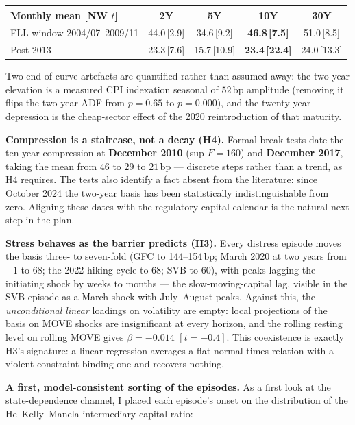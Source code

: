\documentclass[11pt]{article}
\newcommand{\bps}{\,\text{bp}}
\begin{document}
\begin{center}\small
\begin{tabular}{lcccc}
\toprule
Monthly mean [NW $t$] & 2Y & 5Y & 10Y & 30Y \\
\midrule
FLL window 2004/07--2009/11 & 44.0\,[2.9] & 34.6\,[9.2] & \textbf{46.8\,[7.5]} & 51.0\,[8.5] \\
Post-2013 & 23.3\,[7.6] & 15.7\,[10.9] & \textbf{23.4\,[22.4]} & 24.0\,[13.3] \\
\bottomrule
\end{tabular}
\end{center}

Two end-of-curve artefacts are quantified rather than assumed away: the two-year elevation is a measured CPI indexation seasonal of $52\bps$ amplitude (removing it flips the two-year ADF from $p=0.65$ to $p=0.000$), and the twenty-year depression is the cheap-sector effect of the 2020 reintroduction of that maturity.

\textbf{Compression is a staircase, not a decay (H4).} Formal break tests date the ten-year compression at \textbf{December 2010} (sup-$F=160$) and \textbf{December 2017}, taking the mean from $46$ to $29$ to $21\bps$ --- discrete steps rather than a trend, as H4 requires. The tests also identify a fact absent from the literature: since October 2024 the two-year basis has been statistically indistinguishable from zero. Aligning these dates with the regulatory capital calendar is the natural next step in the plan.

\textbf{Stress behaves as the barrier predicts (H3).} Every distress episode moves the basis three- to seven-fold (GFC to 144--154$\bps$; March 2020 at two years from $-1$ to $68$; the 2022 hiking cycle to 68; SVB to 60), with peaks lagging the initiating shock by weeks to months --- the slow-moving-capital lag, visible in the SVB episode as a March shock with July--August peaks. Against this, the \emph{unconditional linear} loadings on volatility are empty: local projections of the basis on MOVE shocks are insignificant at every horizon, and the rolling resting level on rolling MOVE gives $\beta=-0.014$ $[t=-0.4]$. This coexistence is exactly H3's signature: a linear regression averages a flat normal-times relation with a violent constraint-binding one and recovers nothing.

\textbf{A first, model-consistent sorting of the episodes.} As a first look at the state-dependence channel, I placed each episode's onset on the distribution of the He--Kelly--Manela intermediary capital ratio:
\end{document}
